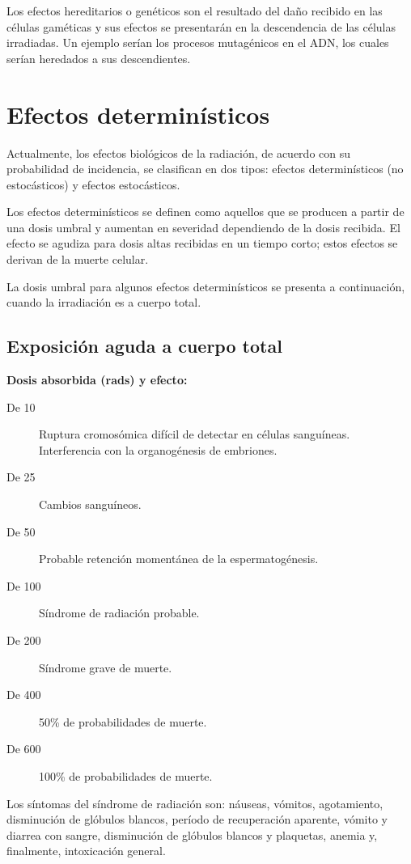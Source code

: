 Los efectos hereditarios o genéticos son el resultado del daño recibido en las células gaméticas y sus efectos se presentarán en la descendencia de las células irradiadas. Un ejemplo serían los procesos mutagénicos en el ADN, los cuales serían heredados a sus descendientes.

\section{Efectos determinísticos}

Actualmente, los efectos biológicos de la radiación, de acuerdo con su probabilidad de incidencia, se clasifican en dos tipos: efectos determinísticos (no estocásticos) y efectos estocásticos.

Los efectos determinísticos se definen como aquellos que se producen a partir de una dosis umbral y aumentan en severidad dependiendo de la dosis recibida. El efecto se agudiza para dosis altas recibidas en un tiempo corto; estos efectos se derivan de la muerte celular.

La dosis umbral para algunos efectos determinísticos se presenta a continuación, cuando la irradiación es a cuerpo total.

\subsection{Exposición aguda a cuerpo total}

\textbf{Dosis absorbida (rads) y efecto:}
\begin{description}
  \item[De 10] Ruptura cromosómica difícil de detectar en células sanguíneas. Interferencia con la organogénesis de embriones.
  \item[De 25] Cambios sanguíneos.
  \item[De 50] Probable retención momentánea de la espermatogénesis.
  \item[De 100] Síndrome de radiación probable.
  \item[De 200] Síndrome grave de muerte.
  \item[De 400] 50\% de probabilidades de muerte.
  \item[De 600] 100\% de probabilidades de muerte.
\end{description}

Los síntomas del síndrome de radiación son: náuseas, vómitos, agotamiento, disminución de glóbulos blancos, período de recuperación aparente, vómito y diarrea con sangre, disminución de glóbulos blancos y plaquetas, anemia y, finalmente, intoxicación general.

